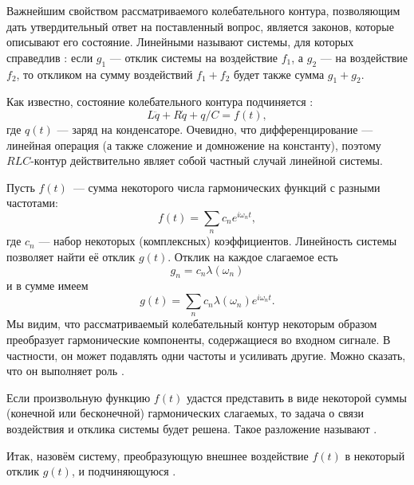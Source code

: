 Важнейшим свойством рассматриваемого колебательного контура, позволяющим
дать утвердительный ответ на поставленный вопрос, является
 законов, которые описывают его состояние.
Линейными называют системы, для которых справедлив :
если $g_1$ --- отклик системы на воздействие $f_1$, а $g_2$ --- на воздействие
$f_2$, то откликом на сумму воздействий $f_1 + f_2$ будет также сумма $g_1 + g_2$.

Как известно, состояние колебательного контура подчиняется
:
\begin{equation*}
L\ddot{q} + R\dot{q} + q/C=f(t),
\end{equation*}
где $q(t)$ --- заряд на конденсаторе. Очевидно, что дифференцирование ---
линейная операция (а также сложение и домножение на константу),
поэтому $RLC$-контур действительно являет собой частный случай линейной системы.

Пусть $f(t)$~--- сумма некоторого числа гармонических функций с разными частотами:
\begin{equation*}
f(t) = \sum\limits_n c_n e^{i\omega_n t},
\end{equation*}
где $c_n$ --- набор некоторых (комплексных) коэффициентов.
Линейность системы позволяет найти её отклик $g(t)$.
Отклик на каждое слагаемое есть
\begin{equation*}
 g_n = c_n\lambda(\omega_n)
\end{equation*}
и в сумме имеем
\begin{equation*}
g(t) = \sum\limits_n  c_n \lambda (\omega_n) e^{i\omega_n t}.
\end{equation*}
Мы видим, что рассматриваемый колебательный контур некоторым образом
преобразует гармонические компоненты, содержащиеся во входном сигнале.
В частности, он может подавлять одни частоты и усиливать другие.
Можно сказать, что он выполняет роль .

Если произвольную функцию $f(t)$ удастся представить в виде
некоторой суммы (конечной или бесконечной) гармонических слагаемых, то
задача о связи воздействия и отклика системы будет решена.
Такое разложение называют .



Итак, назовём  систему,
преобразующую внешнее воздействие $f(t)$ в некоторый отклик $g(t)$,
и подчиняющуюся .

